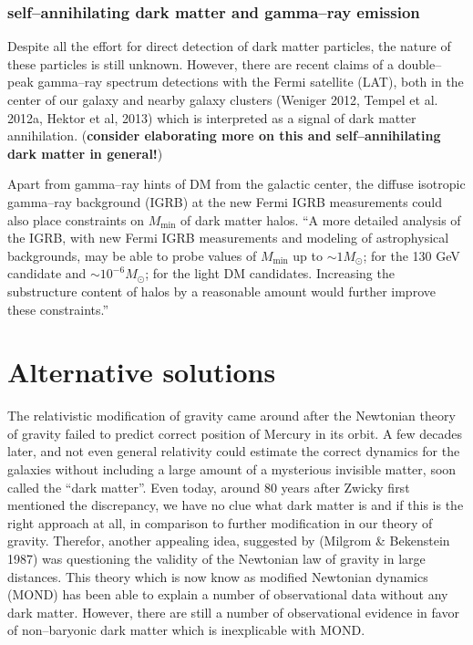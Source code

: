\documentclass[paper=a4, fontsize=11pt]{scrartcl} %
\numberwithin{equation}{section} %
\numberwithin{figure}{section} %
\numberwithin{table}{section} %
\begin{document}
\subsubsection{self--annihilating dark matter and gamma--ray emission}
Despite all the effort for direct detection of dark matter particles, the nature of these particles is still unknown. However, there are recent claims of a double--peak gamma--ray spectrum detections with the Fermi satellite (LAT), both in the center of our galaxy and nearby galaxy clusters (Weniger 2012, Tempel et al. 2012a, Hektor et al, 2013) which is interpreted as a signal of dark matter annihilation. ({\bf consider elaborating more on this and self--annihilating dark matter in general!})

Apart from gamma--ray hints of DM from the galactic center, the diffuse isotropic gamma--ray background (IGRB) at the new Fermi IGRB measurements could also place constraints on $M_\mathrm{min}$ of dark matter halos. ``A more detailed analysis of the IGRB, with new Fermi IGRB measurements and modeling of astrophysical backgrounds, may be able to probe values of $M_\mathrm{min}$ up to $\sim 1 M_\odot$; for the 130 GeV candidate and $\sim 10^{-6} M_\odot$; for the light DM candidates. Increasing the substructure content of halos by a reasonable amount would further improve these constraints.'' %

\section{Alternative solutions}
The relativistic modification of gravity came around after the Newtonian theory of gravity failed to predict correct position of Mercury in its orbit. A few decades later, and not even general relativity could estimate the correct dynamics for the galaxies without including a large amount of a mysterious invisible matter, soon called the ``dark matter''. Even today, around 80 years after Zwicky first mentioned the discrepancy, we have no clue what dark matter is and if this is the right approach at all, in comparison to further modification in our theory of gravity. 
Therefor, another appealing idea, suggested by (Milgrom \& Bekenstein 1987) was questioning the validity of the Newtonian law of gravity in large distances. This theory which is now know as modified Newtonian dynamics (MOND) has been able to explain a number of observational data without any dark matter. However, there are still a number of observational evidence in favor of non--baryonic dark matter which is inexplicable with MOND. 
\end{document}
